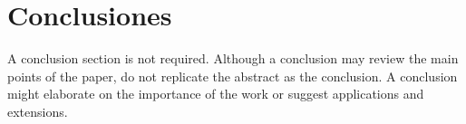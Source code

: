 \documentclass[a4paper]{IEEEtran} %
\begin{document}

\section{Conclusiones}
A conclusion section is not required. Although a conclusion may review the 
main points of the paper, do not replicate the abstract as the conclusion. A 
conclusion might elaborate on the importance of the work or suggest 
applications and extensions. 




\end{document}
